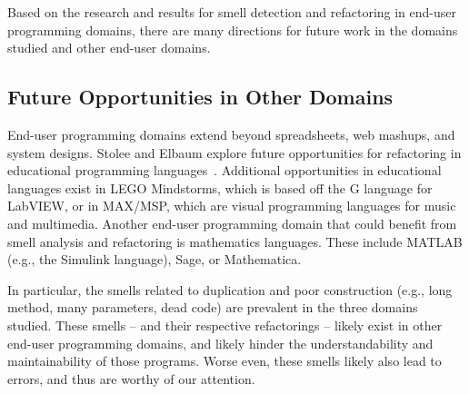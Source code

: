 \documentclass[10pt,conference,compsocconf]{IEEEtran}
\begin{document}
Based on the research and results for smell detection and refactoring in end-user programming domains, there are many directions for future work in the domains studied and other end-user domains.

\subsection{Future Opportunities in Other Domains}
End-user programming domains extend beyond spreadsheets, web mashups, and system designs. Stolee and Elbaum explore future opportunities for refactoring in educational programming languages~\cite{StoleeTSE2013}. Additional opportunities in educational languages exist in LEGO Mindstorms, which is based off the G language for LabVIEW, or in MAX/MSP, which are visual programming languages for music and multimedia.  Another end-user programming domain that could benefit from smell analysis and refactoring is mathematics languages. These include MATLAB (e.g., the Simulink language), Sage, or Mathematica.

In particular, the smells related to duplication and poor construction (e.g., long method, many parameters, dead code) are  prevalent in the three domains studied. These smells -- and their respective refactorings -- likely exist in other end-user programming domains, and likely hinder the understandability and maintainability of those programs. Worse even, these smells likely also lead to errors, and thus are worthy of our attention. 


\end{document}
